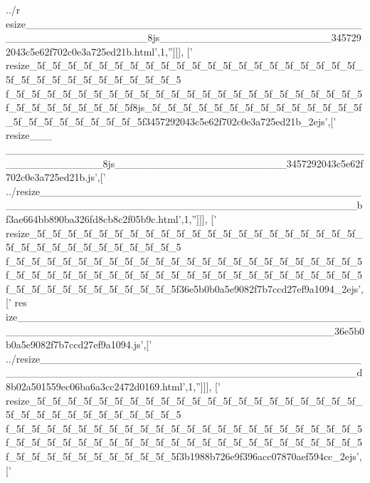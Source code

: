 \begin{DoxyCode}
{      ../r
      esize\_\_\_\_\_\_\_\_\_\_\_\_\_\_\_\_\_\_\_\_\_\_\_\_\_\_\_\_\_\_\_\_\_\_\_\_\_\_\_\_\_\_\_\_\_\_\_\_\_\_\_\_\_\_\_\_\_\_\_\_\_\_\_\_8js\_\_\_\_\_\_\_\_\_\_\_\_\_\_\_\_\_\_\_\_\_\_\_3457292043c5e62f702c0e3a725ed21b.html'},1,\textcolor{stringliteral}{''}]]],
  [\textcolor{stringliteral}{'
      resize\_5f\_5f\_5f\_5f\_5f\_5f\_5f\_5f\_5f\_5f\_5f\_5f\_5f\_5f\_5f\_5f\_5f\_5f\_5f\_5f\_5f\_5f\_5f\_5f\_5f\_5f\_5f\_5f\_5f\_5f\_5f\_5f\_5
      f\_5f\_5f\_5f\_5f\_5f\_5f\_5f\_5f\_5f\_5f\_5f\_5f\_5f\_5f\_5f\_5f\_5f\_5f\_5f\_5f\_5f\_5f\_5f\_5f\_5f\_5f\_5f\_5f\_5f\_5f\_5f8js\_5f\_5f\_5f\_5f\_5f\_5f\_5f\_5f\_5f\_5f\_5f\_5f\_5f\_5f\_5f\_5f\_5f\_5f\_5f\_5f\_5f\_5f\_5f3457292043c5e62f702c0e3a725ed21b\_2ejs'},[\textcolor{stringliteral}{'
      resize\_\_\_
      \_\_\_\_\_\_\_\_\_\_\_\_\_\_\_\_\_\_\_\_\_\_\_\_\_\_\_\_\_\_\_\_\_\_\_\_\_\_\_\_\_\_\_\_\_\_\_\_\_\_\_\_\_\_\_\_\_\_\_\_\_8js\_\_\_\_\_\_\_\_\_\_\_\_\_\_\_\_\_\_\_\_\_\_\_3457292043c5e62f702c0e3a725ed21b.js'},[\textcolor{stringliteral}{'
      ../resize\_\_\_\_\_\_\_\_\_\_\_\_\_\_\_\_\_\_\_\_\_\_\_\_\_\_\_\_\_\_\_\_\_\_\_\_\_\_\_\_\_\_\_\_\_\_\_\_\_\_\_\_\_\_\_\_\_\_\_\_\_\_\_\_\_\_\_\_\_\_\_\_\_\_\_\_\_\_\_\_\_\_\_\_\_\_\_\_\_\_bf3ae664bb890ba326fd8cb8c2f05b9c.html'},1,\textcolor{stringliteral}{''}]]],
  [\textcolor{stringliteral}{'
      resize\_5f\_5f\_5f\_5f\_5f\_5f\_5f\_5f\_5f\_5f\_5f\_5f\_5f\_5f\_5f\_5f\_5f\_5f\_5f\_5f\_5f\_5f\_5f\_5f\_5f\_5f\_5f\_5f\_5f\_5f\_5f\_5f\_5
      f\_5f\_5f\_5f\_5f\_5f\_5f\_5f\_5f\_5f\_5f\_5f\_5f\_5f\_5f\_5f\_5f\_5f\_5f\_5f\_5f\_5f\_5f\_5f\_5f\_5f\_5f\_5f\_5f\_5f\_5f\_5f\_5f\_5f\_5f\_5f\_5f\_5f\_5f\_5f\_5f\_5f\_5f\_5f\_5f\_5f\_5f\_5f\_5f\_5f\_5f\_5f\_5f\_5f\_5f\_5f\_5f\_5f36e5b0b0a5e9082f7b7ccd27ef9a1094\_2ejs'},[\textcolor{stringliteral}{'
      res
      ize\_\_\_\_\_\_\_\_\_\_\_\_\_\_\_\_\_\_\_\_\_\_\_\_\_\_\_\_\_\_\_\_\_\_\_\_\_\_\_\_\_\_\_\_\_\_\_\_\_\_\_\_\_\_\_\_\_\_\_\_\_\_\_\_\_\_\_\_\_\_\_\_\_\_\_\_\_\_\_\_\_\_\_\_\_\_\_\_\_\_36e5b0b0a5e9082f7b7ccd27ef9a1094.js'},[\textcolor{stringliteral}{'
      ../resize\_\_\_\_\_\_\_\_\_\_\_\_\_\_\_\_\_\_\_\_\_\_\_\_\_\_\_\_\_\_\_\_\_\_\_\_\_\_\_\_\_\_\_\_\_\_\_\_\_\_\_\_\_\_\_\_\_\_\_\_\_\_\_\_\_\_\_\_\_\_\_\_\_\_\_\_\_\_\_\_\_\_\_\_\_\_\_\_\_\_d8b02a501559ec06ba6a3cc2472d0169.html'},1,\textcolor{stringliteral}{''}]]],
  [\textcolor{stringliteral}{'
      resize\_5f\_5f\_5f\_5f\_5f\_5f\_5f\_5f\_5f\_5f\_5f\_5f\_5f\_5f\_5f\_5f\_5f\_5f\_5f\_5f\_5f\_5f\_5f\_5f\_5f\_5f\_5f\_5f\_5f\_5f\_5f\_5f\_5
      f\_5f\_5f\_5f\_5f\_5f\_5f\_5f\_5f\_5f\_5f\_5f\_5f\_5f\_5f\_5f\_5f\_5f\_5f\_5f\_5f\_5f\_5f\_5f\_5f\_5f\_5f\_5f\_5f\_5f\_5f\_5f\_5f\_5f\_5f\_5f\_5f\_5f\_5f\_5f\_5f\_5f\_5f\_5f\_5f\_5f\_5f\_5f\_5f\_5f\_5f\_5f\_5f\_5f\_5f\_5f\_5f\_5f3b1988b726e9f396acc07870aef594cc\_2ejs'},[\textcolor{stringliteral}{'
}
\end{DoxyCode}
